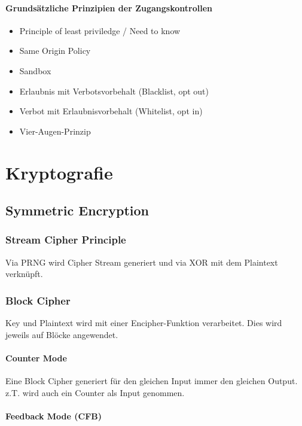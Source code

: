 \paragraph{Grundsätzliche Prinzipien der Zugangskontrollen}

\begin{itemize}
	\item Principle of least priviledge / Need to know
	\item Same Origin Policy
	\item Sandbox
	\item Erlaubnis mit Verbotsvorbehalt (Blacklist, opt out)
	\item Verbot mit Erlaubnisvorbehalt (Whitelist, opt in)
	\item Vier-Augen-Prinzip
\end{itemize}


\section{Kryptografie}



\subsection{Symmetric Encryption}

\subsubsection{Stream Cipher Principle}
Via PRNG wird Cipher Stream generiert und via XOR mit dem Plaintext verknüpft.

\subsubsection{Block Cipher}
Key und Plaintext wird mit einer Encipher-Funktion verarbeitet. Dies wird jeweils auf Blöcke angewendet.

\paragraph{Counter Mode}
Eine Block Cipher generiert für den gleichen Input immer den gleichen Output.
z.T. wird auch ein Counter als Input genommen.

\paragraph{Feedback Mode (CFB)}

